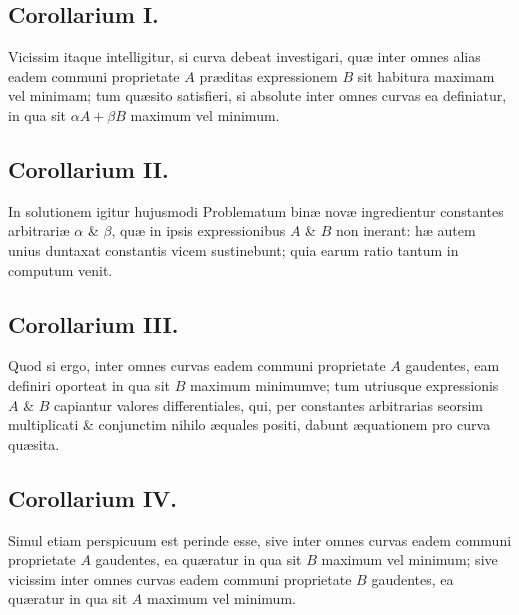 \subsection*{Corollarium I.}
Vicissim itaque intelligitur, si curva debeat investigari, quæ inter omnes alias eadem communi proprietate $A$ præditas expressionem $B$ sit habitura maximam vel minimam; tum quæsito satisfieri, si absolute inter omnes curvas ea definiatur, in qua sit $\alpha A+\beta B$ maximum vel minimum.
\subsection*{Corollarium II.}
In solutionem igitur hujusmodi Problematum binæ novæ ingredientur constantes arbitrariæ $\alpha$ \& $\beta$, quæ in ipsis expressionibus $A$ \& $B$ non inerant: hæ autem unius duntaxat constantis vicem sustinebunt; quia earum ratio tantum in computum venit.
\subsection*{Corollarium III.}
Quod si ergo, inter omnes curvas eadem communi proprietate $A$ gaudentes, eam definiri oporteat in qua sit $B$ maximum minimumve; tum utriusque expressionis $A$ \& $B$ capiantur valores differentiales, qui, per constantes arbitrarias seorsim multiplicati \& conjunctim nihilo æquales positi, dabunt æquationem pro curva quæsita.
\subsection*{Corollarium IV.}
Simul etiam perspicuum est perinde esse, sive inter omnes curvas eadem communi proprietate $A$ gaudentes, ea quæratur in qua sit $B$ maximum vel minimum; sive vicissim inter omnes curvas eadem communi proprietate $B$ gaudentes, ea quæratur in qua sit $A$ maximum vel minimum.
